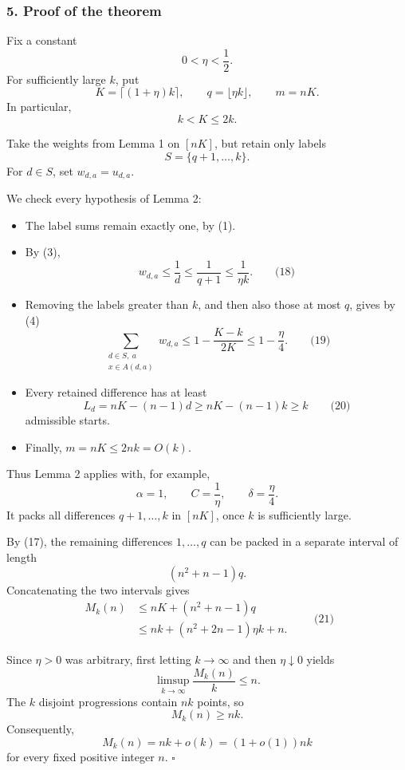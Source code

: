 \documentclass[
  11pt,
  a4paper,
]{article}
\providecommand{\tightlist}{%
  \setlength{\itemsep}{0pt}\setlength{\parskip}{0pt}}
\begin{document}
\subsubsection{5. Proof of the theorem}\label{proof-of-the-theorem}

Fix a constant \[
0<\eta<\frac12.
\] For sufficiently large \(k\), put \[
K=\lceil(1+\eta)k\rceil,
\qquad
q=\lfloor\eta k\rfloor,
\qquad
m=nK.
\] In particular, \[
k<K\le2k.
\]

Take the weights from Lemma 1 on \([nK]\), but retain only labels \[
S=\{q+1,\ldots,k\}.
\] For \(d\in S\), set \(w_{d,a}=u_{d,a}\).

We check every hypothesis of Lemma 2:

\begin{itemize}
\tightlist
\item
  The label sums remain exactly one, by (1).
\item
  By (3), \[
  w_{d,a}\le\frac1d
  \le\frac1{q+1}
  \le\frac1{\eta k}.
  \qquad\text{(18)}
  \]
\item
  Removing the labels greater than \(k\), and then also those at most
  \(q\), gives by (4) \[
  \sum_{\substack{d\in S,\ a\\x\in A(d,a)}}w_{d,a}
  \le1-\frac{K-k}{2K}
  \le1-\frac{\eta}{4}.
  \qquad\text{(19)}
  \]
\item
  Every retained difference has at least \[
  L_d=nK-(n-1)d
  \ge nK-(n-1)k
  \ge k
  \qquad\text{(20)}
  \] admissible starts.
\item
  Finally, \(m=nK\le2nk=O(k)\).
\end{itemize}

Thus Lemma 2 applies with, for example, \[
\alpha=1,\qquad C=\frac1\eta,\qquad \delta=\frac\eta4.
\] It packs all differences \(q+1,\ldots,k\) in \([nK]\), once \(k\) is
sufficiently large.

By (17), the remaining differences \(1,\ldots,q\) can be packed in a
separate interval of length \[
(n^2+n-1)q.
\] Concatenating the two intervals gives \begin{equation*}
\begin{aligned}
M_k(n)
&\le nK+(n^2+n-1)q\\
&\le nk+(n^2+2n-1)\eta k+n.
\end{aligned}
\qquad\text{(21)}
\end{equation*}

Since \(\eta>0\) was arbitrary, first letting \(k\to\infty\) and then
\(\eta\downarrow0\) yields \[
\limsup_{k\to\infty}\frac{M_k(n)}k\le n.
\] The \(k\) disjoint progressions contain \(nk\) points, so \[
M_k(n)\ge nk.
\] Consequently, \[
\boxed{M_k(n)=nk+o(k)=(1+o(1))nk}
\] for every fixed positive integer \(n\). \(\square\)
\end{document}
